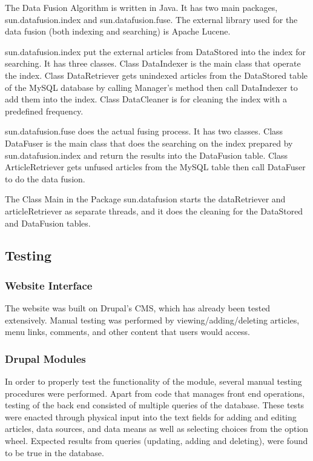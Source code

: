\documentclass[11pt]{article} %
\begin{document}
The Data Fusion Algorithm is written in Java. It has two main packages, sun.datafusion.index and sun.datafusion.fuse. The external library used for the data fusion (both indexing and searching) is Apache Lucene.

sun.datafusion.index put the external articles from DataStored into the index for searching. It has three classes. Class DataIndexer is the main class that operate the index. Class DataRetriever gets unindexed articles from the DataStored table of the MySQL database by calling Manager’s method then call DataIndexer to add them into the index. Class DataCleaner is for cleaning the index with a predefined frequency.

sun.datafusion.fuse does the actual fusing process. It has two classes. Class DataFuser is the main class that does the searching on the index prepared by sun.datafusion.index and return the results into the DataFusion table. Class ArticleRetriever gets unfused articles from the MySQL table then call DataFuser to do the data fusion.

The Class Main in the Package sun.datafusion starts the dataRetriever and articleRetriever as separate threads, and it does the cleaning for the DataStored and DataFusion tables.  

\subsection{Testing}

\subsubsection{Website Interface}

The website was built on Drupal’s CMS, which has already been tested extensively. Manual testing was performed by viewing/adding/deleting articles, menu links, comments, and other content that users would access.

\subsubsection{Drupal Modules}

In order to properly test the functionality of the module, several manual testing procedures were performed. Apart from code that manages front end operations, testing of the back end consisted of multiple queries of the database. These tests were enacted through physical input into the text fields for adding and editing articles, data sources, and data means as well as selecting choices from the option wheel. Expected results from queries (updating, adding and deleting), were found to be true in the database. 
\end{document}
